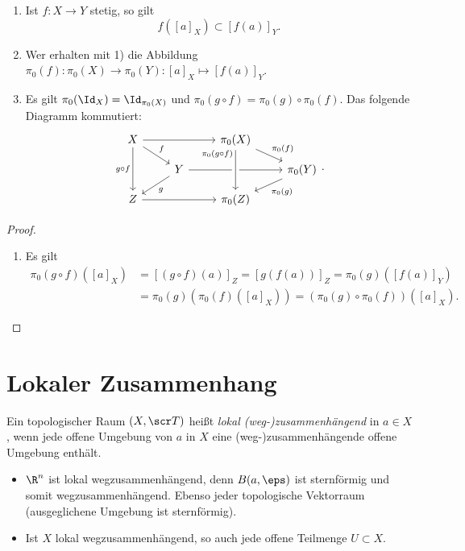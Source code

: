 \begin{st}
	\begin{enumerate}[1)]
		\item
			Ist $f: X \to Y$ stetig, so gilt
			\[
				f([a]_X) \subset [f(a)]_Y.
			\]
		\item
			Wer erhalten mit 1) die Abbildung $\pi_0(f): \pi_0(X) \to \pi_0(Y): [a]_X \mapsto [f(a)]_Y$.
		\item
			Es gilt $\pi_0(\Id_X) = \Id_{\pi_0(X)}$ und $\pi_0(g \circ f) = \pi_0(g) \circ \pi_0(f)$.
			Das folgende Diagramm kommutiert:
			\[
				\begin{tikzcd}[row sep=small]
					X \arrow{dr}{f} \arrow{dd}[left]{g\circ f} \arrow{rr} &  & \pi_0(X) \arrow{dr}{\pi_0(f)} & \\
					& Y \arrow{dl}{g} \arrow{rr} &  & \pi_0(Y) \arrow{dl}{\pi_0(g)}\\
					Z \arrow{rr}  & & \pi_0(Z) \arrow[leftarrow, crossing over]{uu}[yshift=5mm]{\pi_0(g\circ f)} &
				\end{tikzcd}.
			\]
	\end{enumerate}
	\begin{proof}
		\begin{enumerate}[1),start=3]
			\item
				Es gilt
				\begin{align*}
					\pi_0(g\circ f)([a]_X)
					&= [(g\circ f)(a)]_Z
					= [g(f(a))]_Z
					= \pi_0(g)([f(a)]_Y) \\
					&= \pi_0(g)(\pi_0(f)([a]_X))
					= (\pi_0(g)\circ \pi_0(f))([a]_X).
				\end{align*}
		\end{enumerate}
	\end{proof}
\end{st}


\section{Lokaler Zusammenhang}


\begin{df}
	Ein topologischer Raum $(X, \scr T)$ heißt \emph{lokal (weg-)zusammenhängend} in $a \in X$, wenn jede offene Umgebung von $a$ in $X$ eine (weg-)zusammenhängende offene Umgebung enthält.
\end{df}

\begin{ex}
	\begin{itemize}
		\item
			$\R^n$ ist lokal wegzusammenhängend, denn $B(a,\eps)$ ist sternförmig und somit wegzusammenhängend.
			Ebenso jeder topologische Vektorraum (ausgeglichene Umgebung ist sternförmig).
		\item
			Ist $X$ lokal wegzusammenhängend, so auch jede offene Teilmenge $U \subset X$.
	\end{itemize}
\end{ex}

